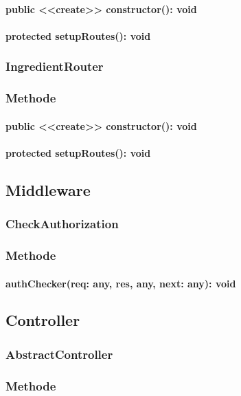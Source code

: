 \documentclass[parskip=full]{scrartcl}
\begin{document}
\paragraph{public <<create>> constructor(): void}
\paragraph{protected setupRoutes(): void}

\subsubsection{IngredientRouter}
\subsubsection*{Methode}
\paragraph{public <<create>> constructor(): void}
\paragraph{protected setupRoutes(): void}

\subsection{Middleware}
\subsubsection{CheckAuthorization}
\subsubsection*{Methode}
\paragraph{authChecker(req: any, res, any, next: any): void}

\subsection{Controller}
\subsubsection{AbstractController}
\subsubsection*{Methode}
\end{document}
